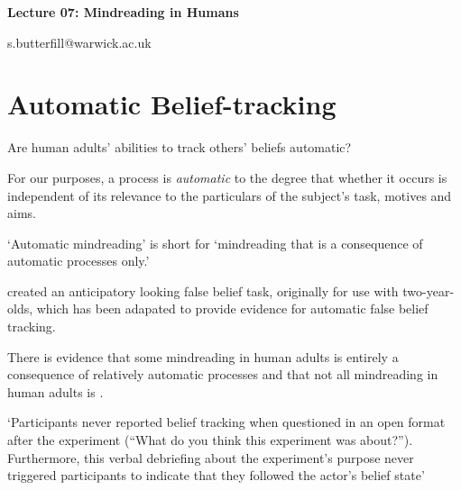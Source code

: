 \documentclass[12pt]{extarticle}
\date{}
\makeatletter
\def \ititle {Origins of Mind}
\def \iemail{s.butterfill@warwick.ac.uk}
\makeatother
\begin{document}
\begin{multicols*}{3}

\setlength\footnotesep{1em}












\def \ititle {Lecture 07: Mindreading in Humans}

\begin{center}

{\Large

\textbf{\ititle}

}



\iemail %

\end{center}



\section{Automatic Belief-tracking}

Are human adults’ abilities to track others’ beliefs automatic?

For our purposes, a process is \emph{automatic} to the degree that whether it occurs is independent of
its relevance to the particulars of the subject's task, motives and aims.

‘Automatic mindreading’ is short for ‘mindreading that is a consequence of
automatic processes only.’

\citet{Southgate:2007js} created an anticipatory looking false belief task, originally
for use with two-year-olds, which has been adapated to provide evidence for automatic
false belief tracking.

There is evidence that some mindreading in human adults is
entirely a consequence of relatively automatic processes
\citep{kovacs_social_2010,Schneider:2011fk,Wel:2013uq} and
that not all mindreading in human adults is
\citep{apperly:2008_back,apperly_why_2010,Wel:2013uq}.

‘Participants never reported belief tracking when questioned in an open format after the experiment
(“What do you think this experiment was about?”). Furthermore, this verbal debriefing about the
experiment’s purpose never triggered participants to indicate that they followed the actor’s belief
state’ \citep[p.~2]{Schneider:2011fk}


\end{multicols*}
\end{document}
